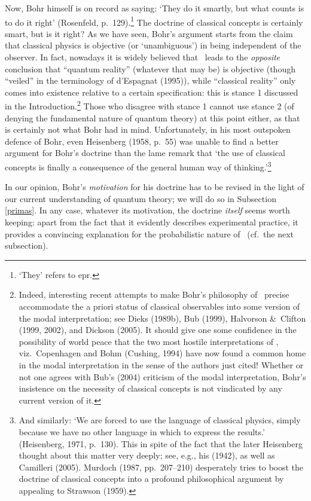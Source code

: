 \documentclass[12pt,titlepage]{article}
\newcommand{\epr}{{\sc epr}}
\begin{document}
Now,  Bohr himself is on record as saying: `They do it smartly, but what counts is to do it right' (Rosenfeld, p.\ 129).\footnote{`They' refers to \epr.}   
The doctrine of classical concepts is certainly smart, but is it right?
As we have seen, Bohr's argument starts from the claim that  classical physics is objective (or `unambiguous') in being independent of the observer. In fact, nowadays it is widely believed that \qm\ leads to the {\it opposite} conclusion that ``quantum reality'' (whatever that may be) is objective (though ``veiled'' in the terminology of d'Espagnat (1995)), while ``classical reality'' only comes into existence relative to a certain specification: this is stance 1 discussed in the Introduction.\footnote{ Indeed,  interesting recent attempts to make  Bohr's philosophy of \qm\ precise accommodate the a priori status of classical observables into some version of the modal interpretation; see Dieks (1989b), Bub (1999),  Halvorson \&\ Clifton (1999, 2002), and Dickson (2005). It should give one some confidence in the possibility of world peace that the two most hostile interpretations of \qm, viz.\ Copenhagen and Bohm (Cushing, 1994) have now found a common home in the modal interpretation in the sense of the authors just cited! Whether or not one agrees with Bub's (2004) criticism of the modal interpretation, Bohr's insistence on the necessity of classical concepts is not vindicated by any current version  of it.}  
 Those who disagree with stance 1 cannot use stance 2 (of denying the fundamental nature of quantum theory) at this point either, as that is certainly not what Bohr had in mind.
 Unfortunately, in his most outspoken defence of Bohr, even  Heisenberg (1958, p.\ 55) was unable to find a better argument for Bohr's doctrine than the lame remark that `the use of classical concepts is finally a consequence of the general human way of thinking.'\footnote{And similarly: `We are forced to use the language of classical physics, simply because we have no other language in which to express the results.' (Heisenberg, 1971, p.\ 130). This in spite of the fact that the later Heisenberg thought about this matter very deeply; see, e.g., his (1942), as well as Camilleri (2005). Murdoch (1987, pp.\ 207--210) desperately tries to boost the doctrine of classical concepts into a profound philosophical argument by appealing to Strawson (1959).}

In our opinion, Bohr's {\it motivation} for his doctrine has to be revised in the light of our current understanding of quantum theory; we will do so in Subsection \ref{primas}. In any case, whatever its motivation, 
the doctrine {\it itself} seems worth keeping: apart from the fact that it evidently describes experimental practice, it provides a convincing explanation for the probabilistic nature of \qm\ (cf.\ the next subsection). 
\end{document}
